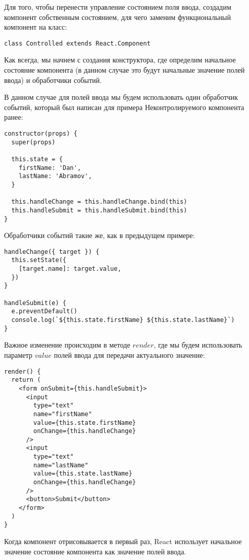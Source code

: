 Для того, чтобы перенести управление состоянием поля ввода, создадим компонент собственным состоянием, для чего заменим функциональный компонент на класс:

\begin{lstlisting}
class Controlled extends React.Component	
\end{lstlisting}

Как всегда, мы начнем с создания конструктора, где определим начальное состояние компонента (в данном случае это будут начальные значение полей ввода) и обработчики событий.

В данном случае для полей ввода мы будем использовать один обработчик событий, который был написан для примера Неконтролируемого компонента ранее:

\begin{lstlisting}
constructor(props) {
  super(props)
  
  this.state = {
    firstName: 'Dan',
    lastName: 'Abramov',
  }
  
  this.handleChange = this.handleChange.bind(this)
  this.handleSubmit = this.handleSubmit.bind(this)
}
\end{lstlisting}

Обработчики событий такие же, как в предыдущем примере:

\begin{lstlisting}
handleChange({ target }) {
  this.setState({
    [target.name]: target.value,
  })
}

handleSubmit(e) {
  e.preventDefault()
  console.log(`${this.state.firstName} ${this.state.lastName}`)
}
\end{lstlisting}

Важное изменение происходим в методе $render$, где мы будем использовать параметр $value$ полей ввода для передачи актуального значение:

\begin{lstlisting}
render() {
  return (
    <form onSubmit={this.handleSubmit}>
      <input
        type="text"
        name="firstName"
        value={this.state.firstName}
        onChange={this.handleChange}
      /> 
      <input
        type="text"
        name="lastName"
        value={this.state.lastName}
        onChange={this.handleChange}
      />
      <button>Submit</button>
    </form> 
  )
}
\end{lstlisting}

Когда компонент отрисовывается в первый раз, React использует начальное значение состояние компонента как значение полей ввода. 

